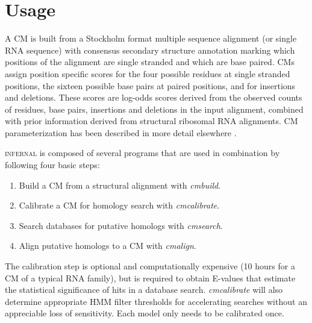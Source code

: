 
\section{Usage} 

A CM is built from a Stockholm format \citep{infguide03} multiple
sequence alignment (or single RNA sequence) with consensus secondary
structure annotation marking which positions of the alignment are
single stranded and which are base paired. CMs assign position
specific scores for the four possible residues at single stranded
positions, the sixteen possible base pairs at paired positions, and
for
insertions and deletions. These scores are log-odds scores derived
from the observed counts of residues, base pairs, insertions and
deletions in the input alignment, combined with prior information
derived from structural ribosomal RNA alignments. 
CM parameterization has been described in more detail elsewhere
\citep{Eddy94,Eddy02b,infguide03,NawrockiEddy07}.

\textsc{infernal} is composed of several programs that are used in
combination %
by following four basic steps: 
\begin{enumerate}
\item Build a CM from a structural alignment with \emph{cmbuild}.
\item Calibrate a CM for homology search with \emph{cmcalibrate}.
\item Search databases for putative homologs with \emph{cmsearch}.
\item Align putative homologs to a CM with \emph{cmalign}.
\end{enumerate}


The calibration step is optional and computationally expensive (10
hours for a CM of a typical RNA family), but is required to obtain
E-values that estimate the statistical significance of hits in a
database search. \emph{cmcalibrate} will also determine appropriate
HMM filter thresholds for accelerating searches without an appreciable
loss of sensitivity. Each model only needs to be calibrated once.

\begin{comment}
(1) \textbf{Build} a CM from a structural alignment with \emph{cmbuild}. 
(2) \textbf{Calibrate} a CM for homology search with \emph{cmcalibrate}.
(3) \textbf{Search} databases for putative homologs to a CM with \emph{cmsearch}.
(4) \textbf{Align} putative homologs to a CM with \emph{cmalign}.
\end{comment}

